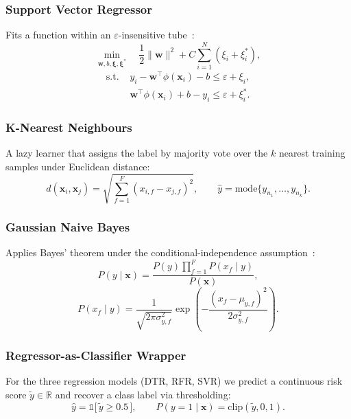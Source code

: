 \documentclass[conference]{IEEEtran}
\begin{document}
\subsubsection{Support Vector Regressor}
Fits a function within an $\varepsilon$-insensitive tube~\cite{drucker1997svr}:
\begin{equation}
\min_{\mathbf{w}, b, \boldsymbol{\xi}, \boldsymbol{\xi}^{*}} \quad \frac{1}{2}\|\mathbf{w}\|^{2} + C\sum_{i=1}^{N}(\xi_i + \xi_i^{*}),
\end{equation}
\begin{equation}
\begin{aligned}
\text{s.t. } & y_i - \mathbf{w}^{\top}\phi(\mathbf{x}_i) - b \le \varepsilon + \xi_i,\\
& \mathbf{w}^{\top}\phi(\mathbf{x}_i) + b - y_i \le \varepsilon + \xi_i^{*}.
\end{aligned}
\end{equation}

\subsubsection{K-Nearest Neighbours}
A lazy learner that assigns the label by majority vote over the $k$ nearest training samples under Euclidean distance:
\begin{equation}
d(\mathbf{x}_i, \mathbf{x}_j) = \sqrt{\sum_{f=1}^{F}(x_{i,f} - x_{j,f})^{2}}, \qquad
\hat{y} = \mathrm{mode}\{y_{n_1}, \dots, y_{n_k}\}.
\end{equation}

\subsubsection{Gaussian Naive Bayes}
Applies Bayes' theorem under the conditional-independence assumption~\cite{rish2001nb}:
\begin{equation}
P(y \mid \mathbf{x}) = \frac{P(y)\prod_{f=1}^{F} P(x_f \mid y)}{P(\mathbf{x})},
\end{equation}
\begin{equation}
P(x_f \mid y) = \frac{1}{\sqrt{2\pi\sigma_{y,f}^{2}}}\exp\!\left(-\frac{(x_f - \mu_{y,f})^{2}}{2\sigma_{y,f}^{2}}\right).
\end{equation}

\subsubsection{Regressor-as-Classifier Wrapper}
For the three regression models (DTR, RFR, SVR) we predict a continuous risk score $\tilde{y} \in \mathbb{R}$ and recover a class label via thresholding:
\begin{equation}
\hat{y} = \mathbb{1}\!\bigl[\,\tilde{y} \geq 0.5\,\bigr],
\qquad
P(y = 1 \mid \mathbf{x}) = \mathrm{clip}(\tilde{y}, 0, 1).
\end{equation}
\end{document}

